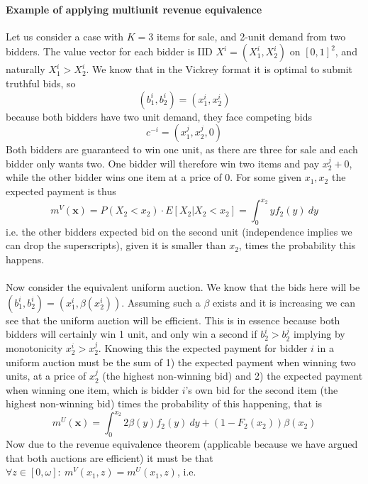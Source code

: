 \paragraph{Example of applying multiunit revenue equivalence}
Let us consider a case with $K=3$ items for sale, and 2-unit demand from two bidders. The value vector for each bidder is IID $X^i=(X_1^i, X_2^i)$ on $[0,1]^2$, and naturally $X_1^i>X_2^i$. We know that in the Vickrey format it is optimal to submit truthful bids, so 
\begin{equation}
    (b_1^i, b_2^i) = (x_1^i, x_2^i)
\end{equation}
because both bidders have two unit demand, they face competing bids 
\begin{equation}
    c^{-i}  = (x_1^j, x_2^j, 0)
\end{equation}
Both bidders are guaranteed to win one unit, as there are three for sale and each bidder only wants two. One bidder will therefore win two items and pay $x_2^j + 0$, while the other bidder wins one item at a price of $0$. For some given $x_1, x_2$ the expected payment is thus 
\begin{equation}
    m^V(\bm{x}) = P(X_2 < x_2)\cdot E[X_2 | X_2 < x_2] = \int_0^{x_2} y f_2(y) \ dy
\end{equation}
i.e. the other bidders expected bid on the second unit (independence implies we can drop the superscripts), given it is smaller than $x_2$, times the probability this happens. 
\\ \\
Now consider the equivalent uniform auction. We know that the bids here will be $(b_1^i, b_2^i) = (x_1^i, \beta(x_2^i))$. Assuming such a $\beta$ exists and it is increasing we can see that the uniform auction will be efficient. This is in essence because both bidders will certainly win 1 unit, and only win a second if $b_2^i > b_2^j$ implying by monotonicity $x_2^i > x_2^j$. Knowing this the expected payment for bidder $i$ in a uniform auction must be the sum of 1) the expected payment when winning two units, at a price of $x_2^j$ (the highest non-winning bid) and 2) the expected payment when winning one item, which is bidder $i$'s own bid for the second item (the highest non-winning bid) times the probability of this happening, that is 
\begin{equation}
    m^U(\bm{x}) = \int_0^{x_2} 2 \beta(y)f_2(y) \ dy 
    + (1- F_2(x_2)) \beta(x_2)
\end{equation}
Now due to the revenue equivalence theorem (applicable because we have argued that both auctions are efficient) it must be that $\forall z\in[0, \omega]: \ m^V(x_1, z)=m^U(x_1, z)$, i.e.
